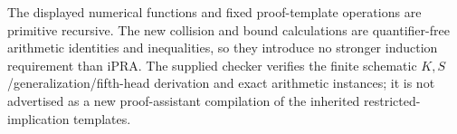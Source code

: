 The displayed numerical functions and fixed proof-template operations
are primitive recursive. The new collision and bound calculations are
quantifier-free arithmetic identities and inequalities, so they introduce
no stronger induction requirement than iPRA. The supplied checker verifies
the finite schematic $K,S$/generalization/fifth-head derivation and exact
arithmetic instances; it is not advertised as a new proof-assistant
compilation of the inherited restricted-implication templates.
